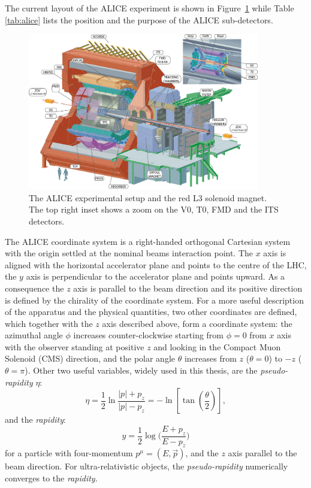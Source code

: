 The current layout of the ALICE experiment is shown in Figure~\ref{fig:alice3D} while Table 
\ref{tab:alice} lists the position and the purpose of the ALICE sub-detectors.
\begin{figure}
    \centering
    \includegraphics[width=0.9\textwidth]{gfx/alice3D}
	\caption{The ALICE experimental setup and the red L3 solenoid magnet. The top right inset shows a zoom on the V0, T0, FMD and the ITS detectors.}
	\label{fig:alice3D}
\end{figure}
The ALICE coordinate system is a right-handed orthogonal Cartesian system with the origin settled at
the nominal beams interaction point.
The $x$ axis is aligned with the horizontal accelerator plane and points to the centre of the LHC,
the $y$ axis is perpendicular to the accelerator plane and points upward.
As a consequence the $z$ axis is parallel to the beam direction and its positive direction is 
defined by the chirality of the coordinate system. 
For a more useful description of the apparatus and the physical quantities, two other coordinates
are defined, which together with the $z$ axis described above, form a coordinate system:
the azimuthal angle $\phi$ increases counter-clockwise starting from $\phi = 0$ from $x$ axis with the
observer standing at positive $z$ and looking in the Compact Muon Solenoid (CMS) direction, and the polar
angle $\theta$ increases from $z$ ($\theta=0$) to $-z$ ($\theta=\pi$).
Other two useful variables, widely used in this thesis, are the \textit{pseudo-rapidity} $\eta$:
\begin{equation}
    \eta = \frac{1}{2} \ln \frac{|p| + p_{z}}{|p| - p_{z}} =
     - \ln \left[ \tan \left(\frac{\theta}{2} \right) \right],
\end{equation}
and the \textit{rapidity}:
\begin{equation} \label{eq:rapidity}
    y = \frac{1}{2} \log \bigl( \frac{E+p_{z}}{E-p_{z}} \bigr) 
\end{equation}
for a particle with four-momentum $p^{\mu} = (E,\vec{p})$, and the $z$ axis parallel to the beam 
direction.
For ultra-relativistic objects, the \textit{pseudo-rapidity} numerically converges to the 
\textit{rapidity}.

